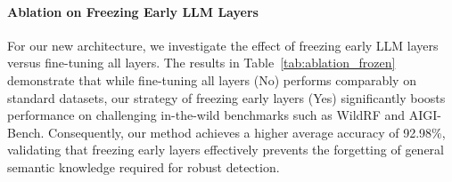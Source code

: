 \documentclass{article}
\theoremstyle{plain}
\theoremstyle{definition}
\theoremstyle{remark}
\begin{document}
\begin{table}[t]
  \centering
  
  \caption{Ablation Study on Freezing the Early LLM Layers.}
  \label{tab:ablation_frozen}
\end{table}

\paragraph{Ablation on Freezing Early LLM Layers}
For our new architecture, we investigate the effect of freezing early LLM layers versus fine-tuning all layers. The results in Table~\ref{tab:ablation_frozen} demonstrate that while fine-tuning all layers (No) performs comparably on standard datasets, our strategy of freezing early layers (Yes) significantly boosts performance on challenging in-the-wild benchmarks such as WildRF and AIGI-Bench. Consequently, our method achieves a higher average accuracy of 92.98\%, validating that freezing early layers effectively prevents the forgetting of general semantic knowledge required for robust detection.


\begin{table}[t]
  \centering
  \caption{Ablation Study on altering different backbones in our method.}
  \label{tab:backbone}
\end{table}
\end{document}
